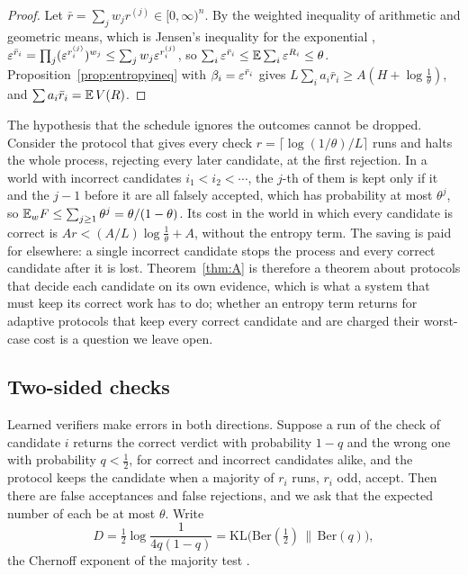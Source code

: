 \begin{proof}
Let $\bar r=\sum_{j}w_{j}r^{(j)}\in[0,\infty)^{n}$. By the weighted inequality of arithmetic and geometric means, which is Jensen's inequality for the exponential \cite{Jen06}, $\varepsilon^{\bar r_{i}}=\prod_{j}(\varepsilon^{r^{(j)}_{i}})^{w_{j}}\le\sum_{j}w_{j}\varepsilon^{r^{(j)}_{i}}$, so $\sum_{i}\varepsilon^{\bar r_{i}}\le\mathbb{E}\sum_{i}\varepsilon^{R_{i}}\le\theta$. Proposition~\ref{prop:entropyineq} with $\beta_{i}=\varepsilon^{\bar r_{i}}$ gives $L\sum_{i}a_{i}\bar r_{i}\ge A(H+\log\frac1\theta)$, and $\sum a_{i}\bar r_{i}=\mathbb{E}\,V(R)$.
\end{proof}

\begin{remark}\label{rem:adaptive}
The hypothesis that the schedule ignores the outcomes cannot be dropped. Consider the protocol that gives every check $r=\lceil\log(1/\theta)/L\rceil$ runs and halts the whole process, rejecting every later candidate, at the first rejection. In a world with incorrect candidates $i_{1}<i_{2}<\cdots$, the $j$-th of them is kept only if it and the $j-1$ before it are all falsely accepted, which has probability at most $\theta^{j}$, so $\mathbb{E}_{w}F\le\sum_{j\ge1}\theta^{j}=\theta/(1-\theta)$. Its cost in the world in which every candidate is correct is $Ar<(A/L)\log\frac1\theta+A$, without the entropy term. The saving is paid for elsewhere: a single incorrect candidate stops the process and every correct candidate after it is lost. Theorem~\ref{thm:A} is therefore a theorem about protocols that decide each candidate on its own evidence, which is what a system that must keep its correct work has to do; whether an entropy term returns for adaptive protocols that keep every correct candidate and are charged their worst-case cost is a question we leave open.
\end{remark}

\subsection{Two-sided checks}\label{ssec:twosided}

Learned verifiers make errors in both directions. Suppose a run of the check of candidate $i$ returns the correct verdict with probability $1-q$ and the wrong one with probability $q<\frac12$, for correct and incorrect candidates alike, and the protocol keeps the candidate when a majority of $r_{i}$ runs, $r_{i}$ odd, accept. Then there are false acceptances and false rejections, and we ask that the expected number of each be at most $\theta$. Write
\[
D=\tfrac12\log\frac1{4q(1-q)}=\mathrm{KL}\bigl(\mathrm{Ber}(\tfrac12)\,\big\|\,\mathrm{Ber}(q)\bigr),
\]
the Chernoff exponent of the majority test \cite{Che52,CT06}.

